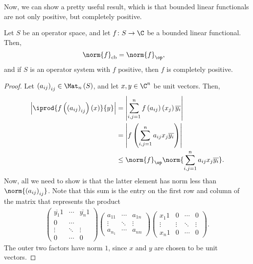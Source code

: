 \documentclass[10pt]{mypackage}
\DeclareMathOperator{\cb}{cb}
\begin{document}
Now, we can show a pretty useful result, which is that bounded linear functionals are not only positive, but completely positive.
\begin{proposition}
  Let $S$ be an operator space, and let $f\colon S\rightarrow \C$ be a bounded linear functional. Then,
  \begin{align*}
    \norm{f}_{\cb} &= \norm{f}_{\op},
  \end{align*}
  and if $S$ is an operator system with $f$ positive, then $f$ is completely positive.
\end{proposition}
\begin{proof}
  Let $\left( a_{ij} \right)_{ij}\in \Mat_n\left( S \right)$, and let $x,y\in \C^n$ be unit vectors. Then,
  \begin{align*}
    \left\vert \iprod{f\left( \left( a_{ij} \right)_{ij} \right)\left( x \right)}{y} \right\vert &= \left\vert \sum_{i,j=1}^{n}f\left( a_{ij} \right)\left( x_j \right)\overline{y_i} \right\vert\\
                                                                                                 &= \left\vert f\left( \sum_{i,j=1}^{n}a_{ij}x_j\overline{y_i} \right) \right\vert\\
                                                                                                 &\leq \norm{f}_{\op} \norm{\sum_{i,j=1}^{n}a_{ij}x_j\overline{y_i}}.
  \end{align*}
  Now, all we need to show is that the latter element has norm less than $\norm{\left( a_{ij} \right)_{ij}}$. Note that this sum is the entry on the first row and column of the matrix that represents the product
  \begin{align*}
    \begin{pmatrix}\overline{y_1} 1 & \cdots & \overline{y_n}1 \\ 0 & \cdots & \\ \vdots & \ddots & \vdots \\ 0 & \cdots & 0\end{pmatrix} \begin{pmatrix}a_{11} & \cdots & a_{1n} \\ \vdots & \ddots & \vdots \\ a_{n_1} & \cdots & a_{nn}\end{pmatrix} \begin{pmatrix}x_1 1 & 0 & \cdots & 0 \\ \vdots & \vdots & \ddots & \vdots \\ x_n 1 & 0 & \cdots & 0\end{pmatrix}.
  \end{align*}
  The outer two factors have norm $1$, since $x$ and $y$ are chosen to be unit vectors.\newline


\end{proof}
\end{document}
